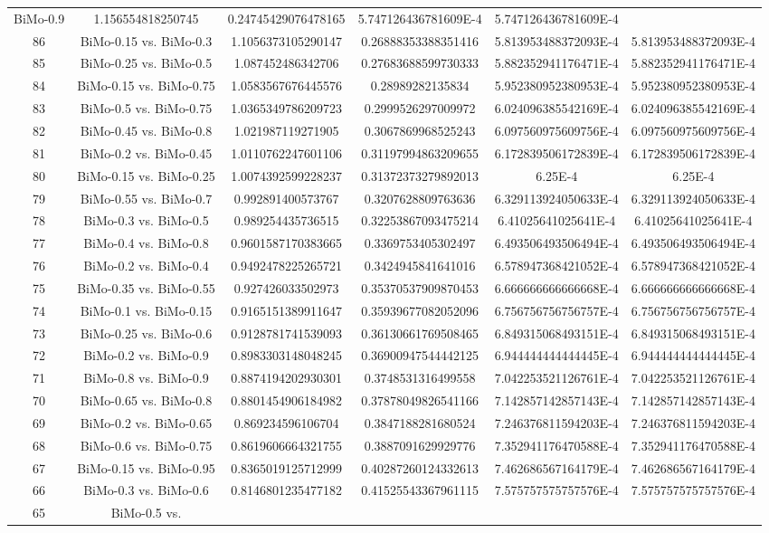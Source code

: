 \documentclass[a4paper,10pt]{article}
\begin{document}
\begin{landscape}
\begin{table}[!htp]
\begin{tabular}{cccccc}
BiMo-0.9&1.156554818250745&0.24745429076478165&5.747126436781609E-4&5.747126436781609E-4\\86&BiMo-0.15 vs. BiMo-0.3&1.1056373105290147&0.26888353388351416&5.813953488372093E-4&5.813953488372093E-4\\85&BiMo-0.25 vs. BiMo-0.5&1.087452486342706&0.27683688599730333&5.882352941176471E-4&5.882352941176471E-4\\84&BiMo-0.15 vs. BiMo-0.75&1.0583567676445576&0.28989282135834&5.952380952380953E-4&5.952380952380953E-4\\83&BiMo-0.5 vs. BiMo-0.75&1.0365349786209723&0.2999526297009972&6.024096385542169E-4&6.024096385542169E-4\\82&BiMo-0.45 vs. BiMo-0.8&1.021987119271905&0.3067869968525243&6.097560975609756E-4&6.097560975609756E-4\\81&BiMo-0.2 vs. BiMo-0.45&1.0110762247601106&0.31197994863209655&6.172839506172839E-4&6.172839506172839E-4\\80&BiMo-0.15 vs. BiMo-0.25&1.0074392599228237&0.31372373279892013&6.25E-4&6.25E-4\\79&BiMo-0.55 vs. BiMo-0.7&0.992891400573767&0.3207628809763636&6.329113924050633E-4&6.329113924050633E-4\\78&BiMo-0.3 vs. BiMo-0.5&0.989254435736515&0.32253867093475214&6.41025641025641E-4&6.41025641025641E-4\\77&BiMo-0.4 vs. BiMo-0.8&0.9601587170383665&0.3369753405302497&6.493506493506494E-4&6.493506493506494E-4\\76&BiMo-0.2 vs. BiMo-0.4&0.9492478225265721&0.3424945841641016&6.578947368421052E-4&6.578947368421052E-4\\75&BiMo-0.35 vs. BiMo-0.55&0.927426033502973&0.35370537909870453&6.666666666666668E-4&6.666666666666668E-4\\74&BiMo-0.1 vs. BiMo-0.15&0.9165151389911647&0.35939677082052096&6.756756756756757E-4&6.756756756756757E-4\\73&BiMo-0.25 vs. BiMo-0.6&0.9128781741539093&0.36130661769508465&6.849315068493151E-4&6.849315068493151E-4\\72&BiMo-0.2 vs. BiMo-0.9&0.8983303148048245&0.36900947544442125&6.944444444444445E-4&6.944444444444445E-4\\71&BiMo-0.8 vs. BiMo-0.9&0.8874194202930301&0.3748531316499558&7.042253521126761E-4&7.042253521126761E-4\\70&BiMo-0.65 vs. BiMo-0.8&0.8801454906184982&0.37878049826541166&7.142857142857143E-4&7.142857142857143E-4\\69&BiMo-0.2 vs. BiMo-0.65&0.869234596106704&0.3847188281680524&7.246376811594203E-4&7.246376811594203E-4\\68&BiMo-0.6 vs. BiMo-0.75&0.8619606664321755&0.3887091629929776&7.352941176470588E-4&7.352941176470588E-4\\67&BiMo-0.15 vs. BiMo-0.95&0.8365019125712999&0.40287260124332613&7.462686567164179E-4&7.462686567164179E-4\\66&BiMo-0.3 vs. BiMo-0.6&0.8146801235477182&0.41525543367961115&7.575757575757576E-4&7.575757575757576E-4\\65&BiMo-0.5 vs. 
\end{tabular}
\end{table}
\end{landscape}
\end{document}
